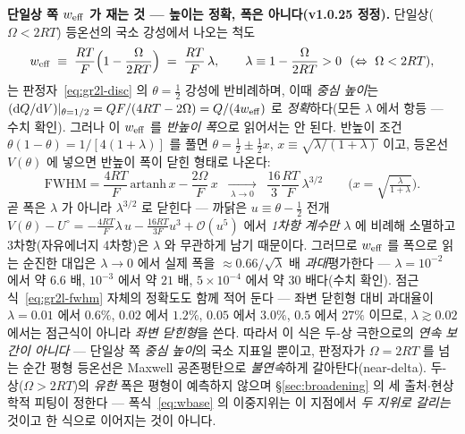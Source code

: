 \textbf{단일상 쪽 $w_{\mathrm{eff}}$ 가 재는 것 --- 높이는 정확, 폭은 아니다(v1.0.25 정정).} 단일상($\Omega<2RT$)
등온선의 국소 강성에서 나오는 척도
\[
w_\eff\;\equiv\;\frac{RT}{F}\Big(1-\frac{\Omega}{2RT}\Big)\;=\;\frac{RT}{F}\,\lambda,
\qquad \lambda\equiv1-\frac{\Omega}{2RT}>0\ \ (\Leftrightarrow\ \Omega<2RT),
\]
는 판정자~\eqref{eq:gr2l-disc} 의 $\theta{=}\tfrac12$ 강성에 반비례하며, 이때 \emph{중심 높이}는
$(\mathrm{d} Q/\mathrm{d} V)|_{\theta=1/2}=QF/(4RT-2\Omega)=Q/(4w_{\mathrm{eff}})$ 로 \emph{정확}하다(모든 $\lambda$ 에서 항등 ---
수치 확인). 그러나 이 $w_{\mathrm{eff}}$ 를 \emph{반높이 폭}으로 읽어서는 안 된다. 반높이 조건
$\theta(1-\theta)=1/[4(1+\lambda)]$ 를 풀면 $\theta=\tfrac12\pm\tfrac12x$, $x\equiv\sqrt{\lambda/(1+\lambda)}$
이고, 등온선 $V(\theta)$ 에 넣으면 반높이 폭이 닫힌 형태로 나온다:
\begin{equation}
\mathrm{FWHM}=\frac{4RT}{F}\,\mathrm{artanh}\,x-\frac{2\Omega}{F}\,x
\;\;\xrightarrow[\;\lambda\to0\;]{}\;\;\frac{16}{3}\frac{RT}{F}\,\lambda^{3/2}
\qquad\Big(x=\sqrt{\tfrac{\lambda}{1+\lambda}}\Big).
\label{eq:gr2l-fwhm}
\end{equation}
곧 폭은 $\lambda$ 가 아니라 $\lambda^{3/2}$ 로 닫힌다 --- 까닭은 $u\equiv\theta-\tfrac12$ 전개
$V(\theta)-U^\circ=-\tfrac{4RT}{F}\lambda\,u-\tfrac{16RT}{3F}u^3+\mathcal O(u^5)$ 에서 \emph{1차항 계수만}
$\lambda$ 에 비례해 소멸하고 3차항(자유에너지 4차항)은 $\lambda$ 와 무관하게 남기 때문이다. 그러므로 $w_{\mathrm{eff}}$ 를 폭으로
읽는 순진한 대입은 $\lambda\to0$ 에서 실제 폭을 $\approx0.66/\sqrt{\lambda}$ 배 \emph{과대}평가한다 ---
$\lambda=10^{-2}$ 에서 약 $6.6$ 배, $10^{-3}$ 에서 약 $21$ 배, $5\times10^{-4}$ 에서 약 $30$ 배다(수치 확인).
점근식~\eqref{eq:gr2l-fwhm} 자체의 정확도도 함께 적어 둔다 --- 좌변 닫힌형 대비 과대율이
$\lambda=0.01$ 에서 $0.6\%$, $0.02$ 에서 $1.2\%$, $0.05$ 에서 $3.0\%$, $0.5$ 에서 $27\%$ 이므로, $\lambda\gtrsim0.02$
에서는 점근식이 아니라 \emph{좌변 닫힌형}을 쓴다. 따라서 이 식은 두-상 극한으로의 \emph{연속 보간이 아니다} --- 단일상 쪽 \emph{중심
높이}의 국소 지표일 뿐이고, 판정자가 $\Omega=2RT$ 를 넘는 순간 평형 등온선은 Maxwell 공존평탄으로
\emph{불연속}하게 갈아탄다(near-delta). 두-상($\Omega>2RT$)의 \emph{유한} 폭은 평형이 예측하지 않으며
\S\ref{sec:broadening} 의 세 출처$\cdot$현상학적 피팅이 정한다 --- 폭식~\eqref{eq:wbase} 의 이중지위는
이 지점에서 \emph{두 지위로 갈리는} 것이고 한 식으로 이어지는 것이 아니다.

